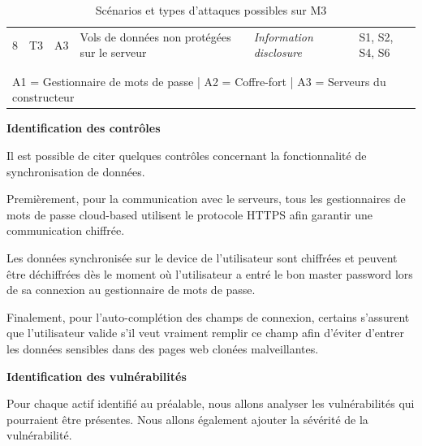 \begin{table}[H]
{\begin{tabular}{ccclll}
			8 & T3  & A3           & Vols de données non protégées sur le serveur                                                                                  & \textit{Information disclosure} & S1, S2, S4, S6          \\				
			\\\\	\hline 
			\multicolumn{6}{l}{A1 = Gestionnaire de mots de passe | A2 = Coffre-fort | A3 = Serveurs du constructeur}\\ \hline
	\end{tabular}}
	\caption{Scénarios et types d'attaques possibles sur M3}
\end{table}

\textbf{Identification des contrôles}

Il est possible de citer quelques contrôles concernant la fonctionnalité de synchronisation de données. 

Premièrement, pour la communication avec le serveurs, tous les gestionnaires de mots de passe cloud-based utilisent le protocole HTTPS afin garantir une communication chiffrée. 

Les données synchronisée sur le device de l'utilisateur sont chiffrées et peuvent être déchiffrées dès le moment où l'utilisateur a entré le bon master password lors de sa connexion au gestionnaire de mots de passe.

Finalement, pour l'auto-complétion des champs de connexion, certains s'assurent que l'utilisateur valide s'il veut vraiment remplir ce champ afin d'éviter d'entrer les données sensibles dans des pages web clonées malveillantes.

\textbf{Identification des vulnérabilités}

Pour chaque actif identifié au préalable, nous allons analyser les vulnérabilités qui pourraient être présentes. Nous allons également ajouter la sévérité de la vulnérabilité. 

